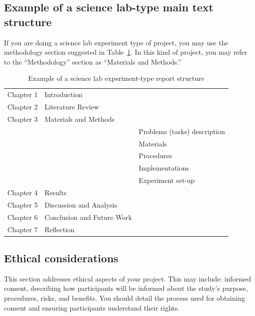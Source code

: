 \subsection{Example of a science lab-type main text structure}
If you are doing a science lab experiment type of project, you may use the  methodology section suggested in Table~\ref{tab:lab_temp}. In this kind of project, you may refer to the ``Methodology'' section as ``Materials and Methods.''
\begin{table}[!ht]
    \centering
    \caption{Example of a science lab experiment-type report structure}
    \label{tab:lab_temp}
    \begin{tabular}{lll}     
        \toprule                   
        Chapter 1 & Introduction  &    \\        
        Chapter 2 & Literature Review  &    \\                
        Chapter 3 & Materials and Methods   &    \\
        &               & Problems (tasks) description  \\
        &               & Materials \\        
        &               & Procedures  \\                
        &               & Implementations   \\
        &               & Experiment set-up   \\
        Chapter 4 & Results       &  \\
        Chapter 5 & Discussion and Analysis  &    \\
        Chapter 6 & Conclusion and Future Work  &    \\        
        Chapter 7 & Reflection  &    \\          
        \bottomrule
    \end{tabular}
\end{table}

\subsection{Ethical considerations}
This section addresses ethical aspects of your project. This may include:
    informed consent, describing how participants will be informed about the study's purpose, procedures, risks, and benefits. You should detail the process used for obtaining consent and ensuring participants understand their rights.


